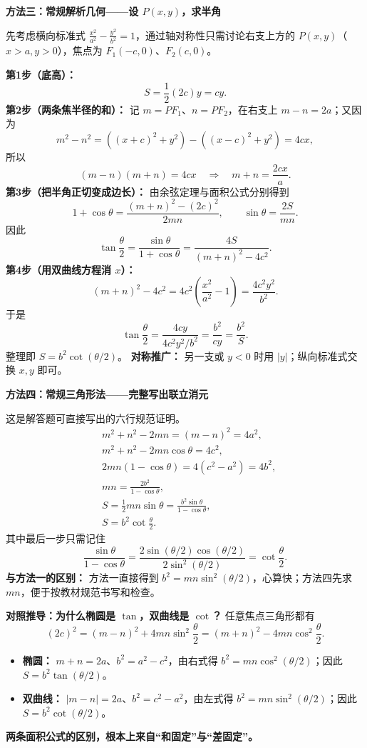 \begin{proofbox}
\textbf{\textcolor{CProof}{方法三：常规解析几何——设 $P(x,y)$，求半角}}

先考虑横向标准式
$\frac{x^2}{a^2}-\frac{y^2}{b^2}=1$，通过轴对称性只需讨论右支上方的 $P(x,y)$（$x>a,y>0$），焦点为 $F_1(-c,0)$、$F_2(c,0)$。

\textbf{第1步（底高）：}
\[S=\frac12(2c)y=cy.\]
\textbf{第2步（两条焦半径的和）：} 记 $m=PF_1$、$n=PF_2$，在右支上 $m-n=2a$；又因为
\[
m^2-n^2=((x+c)^2+y^2)-((x-c)^2+y^2)=4cx,
\]
所以
\[
(m-n)(m+n)=4cx
\quad\Longrightarrow\quad
\boxed{m+n=\frac{2cx}{a}}.
\]
\textbf{第3步（把半角正切变成边长）：} 由余弦定理与面积公式分别得到
\[
1+\cos\theta=\frac{(m+n)^2-(2c)^2}{2mn},
\qquad \sin\theta=\frac{2S}{mn}.
\]
因此
\[
\tan\frac\theta2
=\frac{\sin\theta}{1+\cos\theta}
=\frac{4S}{(m+n)^2-4c^2}.
\]
\textbf{第4步（用双曲线方程消 $x$）：}
\[
(m+n)^2-4c^2
=4c^2\left(\frac{x^2}{a^2}-1\right)
=\frac{4c^2y^2}{b^2}.
\]
于是
\[
\tan\frac\theta2
=\frac{4cy}{4c^2y^2/b^2}
=\frac{b^2}{cy}
=\frac{b^2}{S}.
\]
整理即 $\boxed{S=b^2\cot(\theta/2)}$。
\textbf{对称推广：} 另一支或 $y<0$ 时用 $|y|$；纵向标准式交换 $x,y$ 即可。

\medskip
\end{proofbox}
\clearpage
\begin{proofbox}
\textbf{\textcolor{CProof}{方法四：常规三角形法——完整写出联立消元}}

这是解答题可直接写出的六行规范证明。
\[
\begin{aligned}
&m^2+n^2-2mn=(m-n)^2=4a^2,\\
&m^2+n^2-2mn\cos\theta=4c^2,\\
&2mn(1-\cos\theta)=4(c^2-a^2)=4b^2,\\
&mn=\frac{2b^2}{1-\cos\theta},\\
&S=\frac12 mn\sin\theta
=\frac{b^2\sin\theta}{1-\cos\theta},\\
&\boxed{S=b^2\cot\frac\theta2}.
\end{aligned}
\]
其中最后一步只需记住
\[
\frac{\sin\theta}{1-\cos\theta}
=\frac{2\sin(\theta/2)\cos(\theta/2)}{2\sin^2(\theta/2)}
=\cot\frac\theta2.
\]
\textbf{与方法一的区别：} 方法一直接得到 $b^2=mn\sin^2(\theta/2)$，心算快；方法四先求 $mn$，便于按教材规范书写和检查。

\medskip
\textbf{\textcolor{CProof}{对照推导：为什么椭圆是 $\tan$，双曲线是 $\cot$？}}
任意焦点三角形都有
\[
(2c)^2=(m-n)^2+4mn\sin^2\frac\theta2
=(m+n)^2-4mn\cos^2\frac\theta2.
\]
\begin{itemize}[leftmargin=*,itemsep=0.3em]
\item \textbf{椭圆：} $m+n=2a$、$b^2=a^2-c^2$，由右式得 $b^2=mn\cos^2(\theta/2)$；因此 $S=b^2\tan(\theta/2)$。
\item \textbf{双曲线：} $|m-n|=2a$、$b^2=c^2-a^2$，由左式得 $b^2=mn\sin^2(\theta/2)$；因此 $S=b^2\cot(\theta/2)$。
\end{itemize}
\textbf{两条面积公式的区别，根本上来自“和固定”与“差固定”。}
\end{proofbox}

